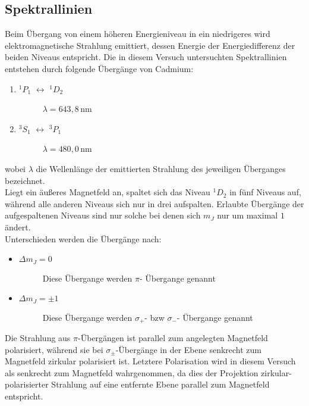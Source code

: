 \clearpage

\subsection{Spektrallinien}
\label{sec:spektral}

Beim Übergang von einem höheren Energieniveau in ein niedrigeres wird elektromagnetische Strahlung emittiert, dessen Energie der Energiedifferenz der beiden Niveaus entspricht.
Die in diesem Versuch untersuchten Spektrallinien entstehen durch folgende Übergänge von Cadmium:
\begin{enumerate}
\item $^1P_1$ $\leftrightarrow$ $^1D_2$
\begin{description}
\item[] $\lambda = 643,8$\,nm
\end{description}	
\item $^3S_1$ $\leftrightarrow$ $^3P_1$
\begin{description}
\item[] $\lambda = 480,0$\,nm
\end{description}	
\end{enumerate}
wobei $\lambda$ die Wellenlänge der emittierten Strahlung des jeweiligen Überganges bezeichnet.\\
Liegt ein äußeres Magnetfeld an, spaltet sich das Niveau $^1D_2$ in fünf Niveaus auf, während alle anderen Niveaus sich nur in drei aufspalten.
Erlaubte Übergänge der aufgespaltenen Niveaus sind nur solche bei denen sich $m_J$ nur um maximal $1$ ändert.\\
Unterschieden werden die Übergänge nach:
\begin{itemize}
\item $\Delta m_J = 0$
\begin{description}
\item[] Diese Übergange werden $\pi$- Übergange genannt
\end{description}
\item $\Delta m_J = \pm 1$
\begin{description}
\item[] Diese Übergange werden $\sigma_+$- bzw $\sigma_-$- Übergange genannt
\end{description}	
\end{itemize}
Die Strahlung aus $\pi$-Übergängen ist parallel zum angelegten Magnetfeld polarisiert, während sie bei $\sigma_\pm$-Übergänge in der Ebene senkrecht zum Magnetfeld zirkular polarisiert ist.
Letztere Polarisation wird in diesem Versuch als senkrecht zum Magnetfeld wahrgenommen, da dies der Projektion zirkular-polarisierter Strahlung auf eine entfernte Ebene parallel zum Magnetfeld entspricht.\\
